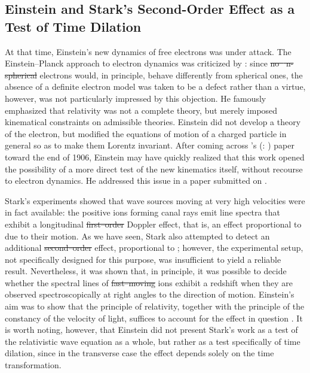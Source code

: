 \documentclass[pdflatex]{sn-jnl} %
\renewcommand{\citets}[2][]{\citeauthor{#2}'s (\citeyear{#2}\if\relax\detokenize{#1}\relax\else: #1\fi)}
\providecommand{\DIFadd}[1]{{\protect\color{blue}\uwave{#1}}} %
\providecommand{\DIFdel}[1]{{\protect\color{red}\sout{#1}}}                      %
\providecommand{\DIFaddbegin}{} %
\providecommand{\DIFaddend}{} %
\providecommand{\DIFdelbegin}{} %
\providecommand{\DIFdelend}{} %
\begin{document}
\DIFdelbegin %
\DIFdelend \DIFaddbegin \subsection{Einstein and Stark’s Second-Order Effect as a Test of Time Dilation}
\DIFaddend %
At that time, Einstein’s new dynamics of free electrons was under attack. The Einstein--Planck approach to electron dynamics was criticized by \citet{Ehrenfest1907}: since \DIFdelbegin \DIFdel{no\mbox{%
\citep[197]{Einstein1907d}}\hskip0pt%
n-spherical }\DIFdelend \DIFaddbegin \DIFadd{non-spherical }\DIFaddend electrons would, in principle, behave differently from spherical ones, the absence of a definite electron model was taken to be a defect rather than a virtue\DIFaddbegin \DIFadd{. }\DIFaddend \citet{Einstein1907a}, however, was not particularly impressed by this objection. He famously emphasized that relativity was not a complete theory, but merely imposed kinematical constraints on admissible theories. Einstein did not develop a theory of the electron, but modified the equations of motion of a charged particle in general so as to make them Lorentz invariant. After coming across \citets{Stark1906} paper toward the end of 1906, Einstein may have quickly realized that this work opened the possibility of a more direct test of the new kinematics itself, without recourse to electron dynamics. He addressed this issue in a paper submitted on .

Stark’s experiments showed that wave sources moving at very high velocities were in fact available: the positive ions forming canal rays emit line spectra that exhibit a longitudinal \DIFdelbegin \DIFdel{first--order }\DIFdelend \DIFaddbegin \DIFadd{first-order }\DIFaddend Doppler effect, that is, an effect proportional to \betafactorh due to their motion. As we have seen, Stark also attempted to detect an additional \DIFdelbegin \DIFdel{second--order }\DIFdelend \DIFaddbegin \DIFadd{second-order }\DIFaddend effect, proportional to \betafactorsquaredh; however, the experimental setup, not specifically designed for this purpose, was insufficient to yield a reliable result. Nevertheless, it was shown that, in principle, it was possible to decide whether the spectral lines of \DIFdelbegin \DIFdel{fast--moving }\DIFdelend \DIFaddbegin \DIFadd{fast-moving }\DIFaddend ions exhibit a redshift when they are observed spectroscopically at right angles to the direction of motion. Einstein’s aim was to show that the principle of relativity, together with the principle of the constancy of the velocity of light, suffices to account for the effect in question \citep[197]{Einstein1907d}. It is worth noting, however, that Einstein did not present Stark’s work as a test of the relativistic wave equation as a whole, but rather as a test specifically of time dilation, since in the transverse case the effect depends solely on the time transformation.
\end{document}
